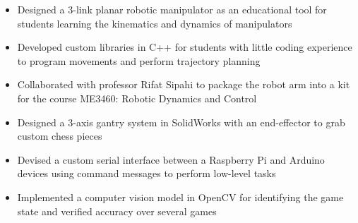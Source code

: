 \documentclass[10pt,a4paper,ragged2e,withhyper]{altacv}
\begin{document}
    \begin{itemize}
        \item Designed a 3-link planar robotic manipulator as an educational tool for students learning the kinematics and dynamics of manipulators
        \item Developed custom libraries in C++ for students with little coding experience to program movements and perform trajectory planning
        \item Collaborated with professor Rifat Sipahi to package the robot arm into a kit for the course ME3460: Robotic Dynamics and Control
    \end{itemize}
    \begin{itemize}
        \item Designed a 3-axis gantry system in SolidWorks with an end-effector to grab custom chess pieces
        \item Devised a custom serial interface between a Raspberry Pi and Arduino devices using command messages to perform low-level tasks
        \item Implemented a computer vision model in OpenCV for identifying the game state and verified accuracy over several games
    \end{itemize}
    \vspace{-1.55em}
\end{document}
